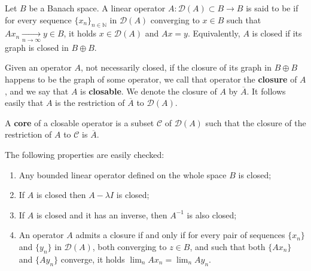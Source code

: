\documentclass[12pt]{article}
\newcommand{\N}{\mathbb{N}}
\begin{document}
Let $B$ be a Banach space. 
A linear operator $A\colon\mathscr{D}(A)\subset B\to B$ is said to be  if
for every sequence $\{x_n\}_{n\in \N}$ in $\mathscr{D}(A)$ converging to $x\in B$ such that $Ax_n\xrightarrow[n\to\infty]{} y\in B$, it holds $x\in\mathscr{D}(A)$ and $Ax = y$. 
Equivalently, $A$ is closed if its graph is closed in $B\oplus B$.

Given an operator $A$, not necessarily closed, if the closure of its graph in $B\oplus B$ happens to be the graph of some operator, we call that operator the \textbf{closure} of $A$, and we say that $A$ is \textbf{closable}. We denote the closure of $A$ by $\overline{A}$. It follows easily that $A$ is the restriction of $\overline{A}$ to $\mathscr{D}(A)$. 

A \textbf{core} of a closable operator is a subset $\mathscr{C}$ of $\mathscr{D}(A)$ such that the closure of the restriction of $A$ to $\mathscr{C}$ is $\overline{A}$.

The following properties are easily checked:
\begin{enumerate}
\item Any bounded linear operator defined on the whole space $B$ is closed;
\item If $A$ is closed then $A-\lambda I$ is closed;
\item If $A$ is closed and it has an inverse, then $A^{-1}$ is also closed;
\item An operator $A$ admits a closure if and only if for every pair of sequences $\{x_n\}$ and $\{y_n\}$ in $\mathscr{D}(A)$, both converging to $z\in B$, and such that both $\{Ax_n\}$ and $\{Ay_n\}$ converge, it holds $\lim_n Ax_n = \lim_n Ay_n$.
\end{enumerate}
\end{document}
